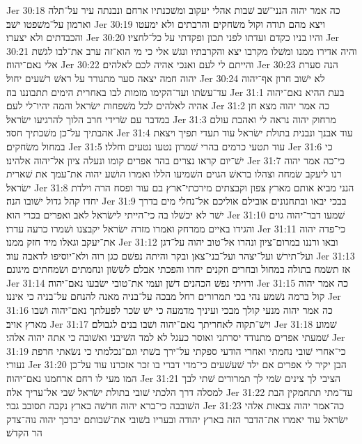 Jer 30:18  כה אמר יהוה הנני־שׁב שׁבות אהלי יעקוב ומשׁכנתיו ארחם ונבנתה עיר על־תלה וארמון על־משׁפטו ישׁב׃
Jer 30:19  ויצא מהם תודה וקול משׂחקים והרבתים ולא ימעטו והכבדתים ולא יצערו׃
Jer 30:20  והיו בניו כקדם ועדתו לפני תכון ופקדתי על כל־לחציו׃
Jer 30:21  והיה אדירו ממנו ומשׁלו מקרבו יצא והקרבתיו ונגשׁ אלי כי מי הוא־זה ערב את־לבו לגשׁת אלי נאם־יהוה׃
Jer 30:22  והייתם לי לעם ואנכי אהיה לכם לאלהים׃
Jer 30:23  הנה סערת יהוה חמה יצאה סער מתגורר על ראשׁ רשׁעים יחול׃
Jer 30:24  לא ישׁוב חרון אף־יהוה עד־עשׂתו ועד־הקימו מזמות לבו באחרית הימים תתבוננו בה׃
Jer 31:1  בעת ההיא נאם־יהוה אהיה לאלהים לכל משׁפחות ישׂראל והמה יהיו־לי לעם׃
Jer 31:2  כה אמר יהוה מצא חן במדבר עם שׂרידי חרב הלוך להרגיעו ישׂראל׃
Jer 31:3  מרחוק יהוה נראה לי ואהבת עולם אהבתיך על־כן משׁכתיך חסד׃
Jer 31:4  עוד אבנך ונבנית בתולת ישׂראל עוד תעדי תפיך ויצאת במחול משׂחקים׃
Jer 31:5  עוד תטעי כרמים בהרי שׁמרון נטעו נטעים וחללו׃
Jer 31:6  כי ישׁ־יום קראו נצרים בהר אפרים קומו ונעלה ציון אל־יהוה אלהינו׃
Jer 31:7  כי־כה אמר יהוה רנו ליעקב שׂמחה וצהלו בראשׁ הגוים השׁמיעו הללו ואמרו הושׁע יהוה את־עמך את שׁארית ישׂראל׃
Jer 31:8  הנני מביא אותם מארץ צפון וקבצתים מירכתי־ארץ בם עור ופסח הרה וילדת יחדו קהל גדול ישׁובו הנה׃
Jer 31:9  בבכי יבאו ובתחנונים אובילם אוליכם אל־נחלי מים בדרך ישׁר לא יכשׁלו בה כי־הייתי לישׂראל לאב ואפרים בכרי הוא׃
Jer 31:10  שׁמעו דבר־יהוה גוים והגידו באיים ממרחק ואמרו מזרה ישׂראל יקבצנו ושׁמרו כרעה עדרו׃
Jer 31:11  כי־פדה יהוה את־יעקב וגאלו מיד חזק ממנו׃
Jer 31:12  ובאו ורננו במרום־ציון ונהרו אל־טוב יהוה על־דגן ועל־תירשׁ ועל־יצהר ועל־בני־צאן ובקר והיתה נפשׁם כגן רוה ולא־יוסיפו לדאבה עוד׃
Jer 31:13  אז תשׂמח בתולה במחול ובחרים וזקנים יחדו והפכתי אבלם לשׂשׂון ונחמתים ושׂמחתים מיגונם׃
Jer 31:14  ורויתי נפשׁ הכהנים דשׁן ועמי את־טובי ישׂבעו נאם־יהוה׃
Jer 31:15  כה אמר יהוה קול ברמה נשׁמע נהי בכי תמרורים רחל מבכה על־בניה מאנה להנחם על־בניה כי איננו׃
Jer 31:16  כה אמר יהוה מנעי קולך מבכי ועיניך מדמעה כי ישׁ שׂכר לפעלתך נאם־יהוה ושׁבו מארץ אויב׃
Jer 31:17  וישׁ־תקוה לאחריתך נאם־יהוה ושׁבו בנים לגבולם׃
Jer 31:18  שׁמוע שׁמעתי אפרים מתנודד יסרתני ואוסר כעגל לא למד השׁיבני ואשׁובה כי אתה יהוה אלהי׃
Jer 31:19  כי־אחרי שׁובי נחמתי ואחרי הודעי ספקתי על־ירך בשׁתי וגם־נכלמתי כי נשׂאתי חרפת נעורי׃
Jer 31:20  הבן יקיר לי אפרים אם ילד שׁעשׁעים כי־מדי דברי בו זכר אזכרנו עוד על־כן המו מעי לו רחם ארחמנו נאם־יהוה׃
Jer 31:21  הציבי לך צינים שׂמי לך תמרורים שׁתי לבך למסלה דרך הלכתי שׁובי בתולת ישׂראל שׁבי אל־עריך אלה׃
Jer 31:22  עד־מתי תתחמקין הבת השׁובבה כי־ברא יהוה חדשׁה בארץ נקבה תסובב גבר׃
Jer 31:23  כה־אמר יהוה צבאות אלהי ישׂראל עוד יאמרו את־הדבר הזה בארץ יהודה ובעריו בשׁובי את־שׁבותם יברכך יהוה נוה־צדק הר הקדשׁ׃
